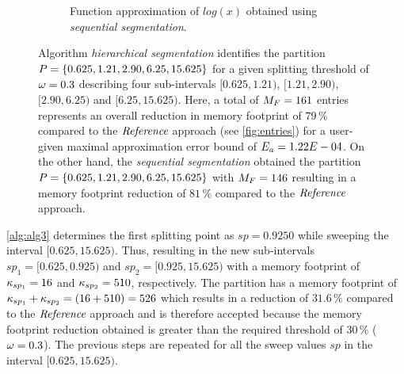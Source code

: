 \begin{figure}[t!]
\begin{subfigure}[b]{0.45\textwidth}
{ }
		\caption{\label{fig:sequential}Function approximation of $log(x)$ obtained using \textit{sequential segmentation}.}
	\end{subfigure}
	\caption{\label{fig:proposedTwo} Algorithm \textit{hierarchical segmentation} identifies the partition $P=\{0.625,1.21,2.90,6.25,15.625\}$ for a given splitting threshold of $\omega =0.3$ describing four sub-intervals $[0.625,1.21)$, $[1.21,2.90)$, $[2.90,6.25)$ and $[6.25,15.625)$.
		Here, a total of $M_{F} = 161$ entries represents an overall reduction in memory footprint of $79\,\%$ compared to the $\textit{Reference}$ approach (see \cref{fig:entries}) for a user-given maximal approximation error bound of $E_a=1.22E-04$.
		On the other hand, the \textit{sequential segmentation} obtained the partition $P=\{0.625,1.21,2.90,6.25,15.625\}$ with $M_{F}=146$ resulting in a memory footprint reduction of $81\,\%$ compared to the $\textit{Reference}$ approach.
	}
\end{figure}
\cref{alg:alg3} determines the first splitting point as $sp=0.9250$ while sweeping the interval $[0.625,15.625)$. 
Thus, resulting in the new sub-intervals $sp_1=[0.625,0.925)$ and $sp_2=[0.925,15.625)$ with a memory footprint of $\kappa_{sp_1}=16$ and $\kappa_{sp_2}=510$, respectively. 
The partition has a memory footprint of $\kappa_{sp_1}+\kappa_{sp_2}=(16+510) = 526$ which results in a reduction of $31.6\,\%$ compared to the $\textit{Reference}$ approach and is therefore accepted because the memory footprint reduction obtained is greater than the required threshold of $30\,\%$ ($\omega=0.3$). 
The previous steps are repeated for all the sweep values $sp$ in the interval $[0.625,15.625)$.
